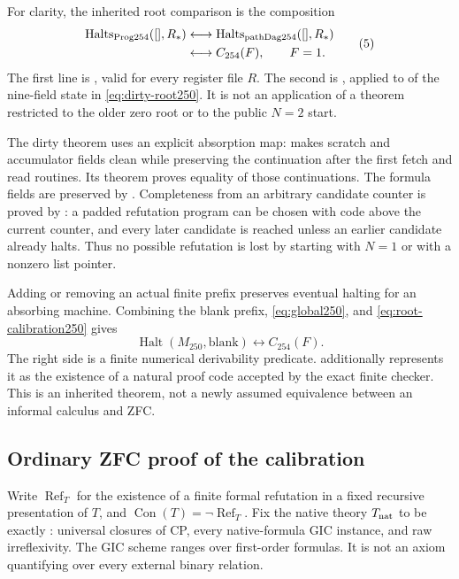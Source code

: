 For clarity, the inherited root comparison is the composition
\[
\begin{split}
 \operatorname{Halts}_{\rm Prog254}([],R_*)
 &\longleftrightarrow
   \operatorname{Halts}_{\rm pathDag254}([],R_*)\\
 &\longleftrightarrow C_{254}(F),\qquad F=1.
\end{split}
\tag{5}\label{eq:root-calibration250}
\]
The first line is
, valid for every register
file $R$.  The second is
, applied to
 of the nine-field state in
\eqref{eq:dirty-root250}.  It is not an application of a theorem
restricted to the older zero root or to the public $N=2$ start.

The dirty theorem uses an explicit absorption map:
 makes scratch and accumulator fields
clean while preserving the continuation after the first fetch and
read routines.  Its theorem
 proves equality of those
continuations.  The formula fields are preserved by
.  Completeness from an arbitrary
candidate counter is proved by
: a padded refutation
program can be chosen with code above the current counter, and
every later candidate is reached unless an earlier candidate
already halts.  Thus no possible refutation is lost by starting
with $N=1$ or with a nonzero list pointer.

Adding or removing an actual finite prefix preserves eventual
halting for an absorbing machine.  Combining the blank prefix,
\eqref{eq:global250}, and \eqref{eq:root-calibration250} gives
\[
 \operatorname{Halt}(M_{250},\mathrm{blank})
 \longleftrightarrow C_{254}(F).
\tag{6}\label{eq:binary-code250}
\]
The right side is a finite numerical derivability predicate.
 additionally represents it
as the existence of a natural proof code accepted by the exact
finite checker.  This is an inherited theorem, not a newly
assumed equivalence between an informal calculus and ZFC.

\subsection{Ordinary ZFC proof of the calibration}

Write $\operatorname{Ref}_T$ for the existence of a finite formal
refutation in a fixed recursive presentation of $T$, and
$\operatorname{Con}(T)=\neg\operatorname{Ref}_T$.  Fix the native
theory $T_{\rm nat}$ to be exactly
: universal closures of CP,
every native-formula GIC instance, and raw irreflexivity.
The GIC scheme ranges over first-order formulas.  It is not an
axiom quantifying over every external binary relation.

